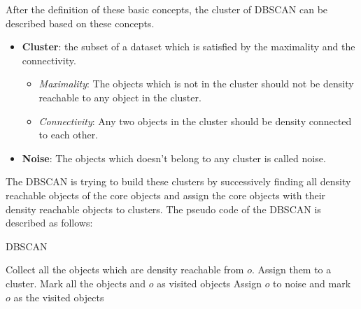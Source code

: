After the definition of these basic concepts, the cluster of DBSCAN can be described based on these concepts. 
\begin{itemize}
\item \textbf{Cluster}: the subset of a dataset which is satisfied by the maximality and the connectivity.
\begin{itemize}
\item \emph{Maximality}:  The objects which is not in the cluster should not be density reachable to any object in the cluster.
\item \emph{Connectivity}: Any two objects in the cluster should be density connected to each other.
\end{itemize}
\item \textbf{Noise}: The objects which doesn't belong to any cluster is called noise.
\end{itemize}
The DBSCAN is trying to build these clusters by successively finding all density reachable objects of the core objects and assign the core objects with their density reachable objects to clusters. The pseudo code of the DBSCAN is described as follows:
\begin{algorithm}
\caption{DBSCAN}
\begin{algorithmic}
\STATE Collect all the objects which are density reachable from $o$. Assign them to a cluster.
\newline Mark all the objects and $o$ as visited objects
\ELSE
\STATE Assign $o$ to noise and mark $o$ as the visited objects
\ENDIF
\ENDFOR
\end{algorithmic}
\end{algorithm}

